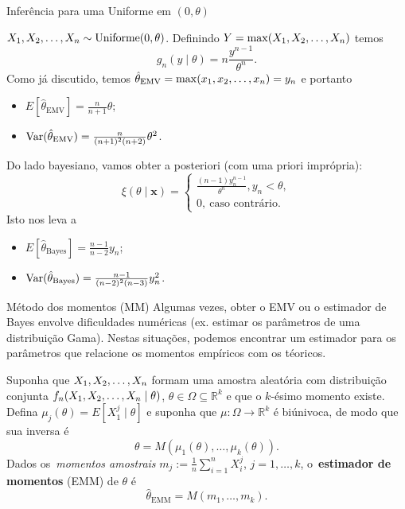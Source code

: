 \begin{frame}{Inferência para uma Uniforme em $(0, \theta)$}
\begin{exemplo}
$X_1, X_2, \ldots, X_n \sim \operatorname{Uniforme}(0, \theta)$.
Definindo $Y = \max(X_1, X_2, \ldots, X_n)$ temos 
\[ g_n(y \mid \theta) = n\frac{y^{n-1}}{\theta^n}. \]
Como já discutido, temos $\hat{\theta}_{\text{EMV}} = \max(x_1, x_2, \ldots, x_n) = y_n$ e portanto
\begin{itemize}
 \item $E[\hat{\theta}_{\text{EMV}}] = \frac{n}{n + 1}\theta$;
 \item $\operatorname{Var}(\hat{\theta}_{\text{EMV}}) =  \frac{n}{(n + 1)^2(n+2)}\theta^2$.
\end{itemize}
Do lado bayesiano, vamos obter a posteriori (com uma priori imprópria):
  \begin{equation}
  \label{eq:uniform_reference_posterior}
    \xi(\theta \mid \boldsymbol{x})=
 \begin{cases}
     \frac{(n-1)y_n^{n-1}}{\theta^n}, y_n < \theta,\\
     0,\:\text{caso contrário}.
\end{cases}
 \end{equation}
Isto nos leva a
\begin{itemize}
 \item $E[\hat{\theta}_{\text{Bayes}}] = \frac{n-1}{n-2}y_n$;
 \item $\operatorname{Var}(\hat{\theta}_{\text{Bayes}}) =  \frac{n-1}{(n - 2)^2(n-3)}y_n^2$.
\end{itemize}
\end{exemplo}
\end{frame}

\begin{frame}{Método dos momentos (MM)}
 Algumas vezes, obter o EMV ou o estimador de Bayes envolve dificuldades numéricas (ex. estimar os parâmetros de uma distribuição Gama).
 Nestas situações, podemos encontrar um estimador para os parâmetros que relacione os momentos empíricos com os téoricos.
 
 \begin{defn}
  Suponha que $X_1, X_2, \ldots, X_n$ formam uma amostra aleatória com distribuição conjunta $f_n(X_1, X_2, \ldots, X_n \mid \theta)$, $\theta \in \Omega \subseteq \mathbb{R}^k$ e que o $k$-ésimo momento existe.
  Defina $\mu_j(\theta) = E[X_1^j \mid \theta]$ e suponha que $\mu : \Omega \to  \mathbb{R}^k$ é biúnivoca, de modo que sua inversa é 
  \[ \theta = M(\mu_1(\theta), \ldots, \mu_k(\theta)).\]
 Dados os~\textit{momentos amostrais} $m_j := \frac{1}{n} \sum_{i=1}^n X_i^j$, $j = 1, \ldots, k$, o~\textbf{estimador de momentos} (EMM) de $\theta$ é 
 \[ \hat{\theta}_{\text{EMM}} = M(m_1, \ldots, m_k). \]
 \end{defn}
\end{frame}

